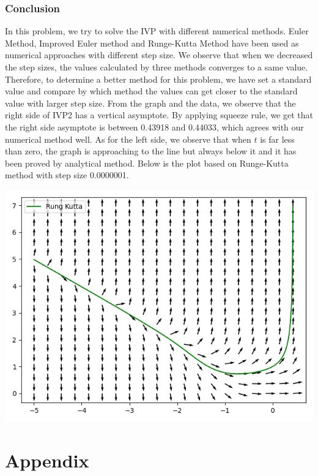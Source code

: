 \documentclass[11pt,a4paper]{article}
\begin{document}
\subsubsection{Conclusion}

In this problem, we try to solve the IVP with different numerical methods. Euler Method, Improved Euler method and Runge-Kutta Method have been used as numerical approaches with different step size. We observe that when we decreased the step sizes, the values calculated by three methods converges to a same value. Therefore, to determine a better method for this problem, we have set a standard value and compare by which method the values can get closer to the standard value with larger step size. 
From the graph and the data, we observe that the right side of IVP2 has a vertical asymptote. By applying squeeze rule, we get that the right side asymptote is between 0.43918 and 0.44033, which agrees with our numerical method well. As for the left side, we observe that when $t$ is far less than zero, the graph is approaching to the line but always below it and it has been proved by analytical method. 
Below is the plot based on Runge-Kutta method with step size 0.0000001. 

\begin{center}
	\includegraphics[scale=0.3]{P2FinalSolution.png}
\end{center}

\newpage

\section{Appendix}
\end{document}
